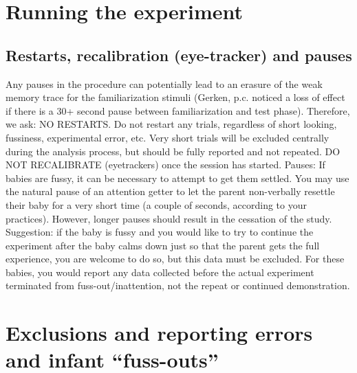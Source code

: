 \documentclass[
]{book}
\begin{document}
\hypertarget{running-the-experiment}{%
\section{Running the experiment}\label{running-the-experiment}}

\hypertarget{restarts-recalibration-eye-tracker-and-pauses}{%
\subsection{Restarts, recalibration (eye-tracker) and pauses}\label{restarts-recalibration-eye-tracker-and-pauses}}

Any pauses in the procedure can potentially lead to an erasure of the weak memory trace for the familiarization stimuli (Gerken, p.c. noticed a loss of effect if there is a 30+ second pause between familiarization and test phase). Therefore, we ask:
NO RESTARTS. Do not restart any trials, regardless of short looking, fussiness, experimental error, etc. Very short trials will be excluded centrally during the analysis process, but should be fully reported and not repeated.
DO NOT RECALIBRATE (eyetrackers) once the session has started.
Pauses: If babies are fussy, it can be necessary to attempt to get them settled. You may use the natural pause of an attention getter to let the parent non-verbally resettle their baby for a very short time (a couple of seconds, according to your practices). However, longer pauses should result in the cessation of the study.
Suggestion: if the baby is fussy and you would like to try to continue the experiment after the baby calms down just so that the parent gets the full experience, you are welcome to do so, but this data must be excluded. For these babies, you would report any data collected before the actual experiment terminated from fuss-out/inattention, not the repeat or continued demonstration.

\hypertarget{exclusions-and-reporting-errors-and-infant-fuss-outs}{%
\section{Exclusions and reporting errors and infant ``fuss-outs''}\label{exclusions-and-reporting-errors-and-infant-fuss-outs}}
\end{document}
